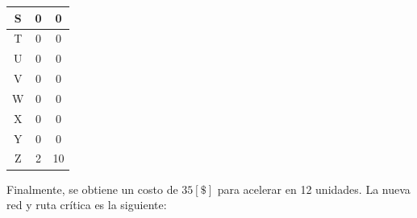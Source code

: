 \documentclass[]{article}
\begin{document}
\begin{table}[ht]
\begin{tabular}{|c|c|c|}
S         & 0           & 0     \\ \hline
T         & 0           & 0     \\ \hline
U         & 0           & 0     \\ \hline
V         & 0           & 0     \\ \hline
W         & 0           & 0     \\ \hline
X         & 0           & 0     \\ \hline
Y         & 0           & 0     \\ \hline
Z         & 2           & 10    \\ \hline
\end{tabular}
\end{table}

\newpage

Finalmente, se obtiene un costo de $35 [\$]$ para acelerar en 12 unidades. La nueva red y ruta crítica es la siguiente:
\end{document}
